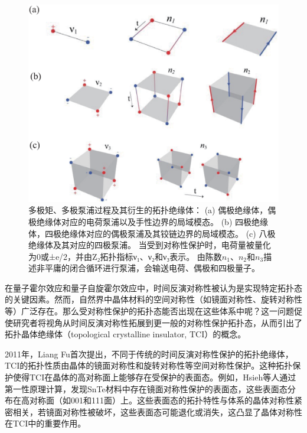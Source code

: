 \begin{figure}[h!]
    \centering
    \includegraphics[width=1\textwidth]{images/fig1-4.eps} 
    \caption{多极矩、多极泵浦过程及其衍生的拓扑绝缘体：
    (a) 偶极绝缘体，偶极绝缘体对应的电荷泵浦以及手性边界的局域模态。
    (b) 四极绝缘体，四极绝缘体对应的偶极泵浦及其铰链边界的局域模态。
    (c) 八极绝缘体及其对应的四极泵浦。
    当受到对称性保护时，电荷量被量化为0或±e/2，并由Z₂拓扑指标ν₁、ν₂和ν₃表示。
    由陈数$n_1$、$n_2$和$n_3$描述非平庸的闭合循环进行泵浦，会输送电荷、偶极和四极量子\cite{f6}。
    }
    \label{fig_1_4}
\end{figure}

在量子霍尔效应和量子自旋霍尔效应中，时间反演对称性被认为是实现特定拓扑态的关键因素。然而，自然界中晶体材料的空间对称性（如镜面对称性、旋转对称性等）广泛存在。那么受对称性保护的拓扑态能否出现在这些体系中呢？这一问题促使研究者将视角从时间反演对称性拓展到更一般的对称性保护拓扑态，从而引出了拓扑晶体绝缘体（topological crystalline insulator, TCI）的概念。

2011年，Liang Fu首次提出\cite{f1}，不同于传统的时间反演对称性保护的拓扑绝缘体，TCI的拓扑性质由晶体的镜面对称性和旋转对称性等空间对称性保护。这种拓扑保护使得TCI在晶体的高对称面上能够存在受保护的表面态。例如，Hsieh等人通过第一性原理计算，发现SnTe材料中存在镜面对称性保护的表面态，这些表面态分布在高对称面（如{001}和{111}面）上\cite{f2}。这些表面态的拓扑特性与体系的晶体对称性紧密相关，若镜面对称性被破坏，这些表面态可能退化或消失，这凸显了晶体对称性在TCI中的重要作用。

